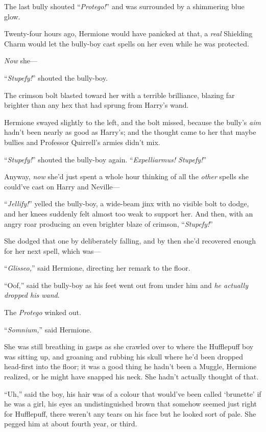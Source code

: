The last bully shouted “\emph{Protego!}” and was surrounded by a shimmering blue glow.

Twenty-four hours ago, Hermione would have panicked at that, a \emph{real} Shielding Charm would let the bully-boy cast spells on her even while he was protected.

\emph{Now} she—

“\emph{Stupefy!}” shouted the bully-boy.

The crimson bolt blasted toward her with a terrible brilliance, blazing far brighter than any hex that had sprung from Harry’s wand.

Hermione swayed slightly to the left, and the bolt missed, because the bully’s \emph{aim} hadn’t been nearly as good as Harry’s; and the thought came to her that maybe bullies and Professor Quirrell’s armies didn’t mix.

“\emph{Stupefy!}” shouted the bully-boy again. “\emph{Expelliarmus! Stupefy!}”

Anyway, \emph{now} she’d just spent a whole hour thinking of all the \emph{other} spells she could’ve cast on Harry and Neville—

“\emph{Jellify!}” yelled the bully-boy, a wide-beam jinx with no visible bolt to dodge, and her knees suddenly felt almost too weak to support her. And then, with an angry roar producing an even brighter blaze of crimson, “\emph{Stupefy!}”

She dodged that one by deliberately falling, and by then she’d recovered enough for her next spell, which was—

“\emph{Glisseo,}” said Hermione, directing her remark to the floor.

“Oof,” said the bully-boy as his feet went out from under him and \emph{he actually dropped his wand}.

The \emph{Protego} winked out.

“\emph{Somnium,}” said Hermione.

She was still breathing in gasps as she crawled over to where the Hufflepuff boy was sitting up, and groaning and rubbing his skull where he’d been dropped head-first into the floor; it was a good thing he hadn’t been a Muggle, Hermione realized, or he might have snapped his neck. She hadn’t actually thought of that.

“Uh,” said the boy, his hair was of a colour that would’ve been called ‘brunette’ if he was a girl, his eyes an undistinguished brown that somehow seemed just right for Hufflepuff, there weren’t any tears on his face but he looked sort of pale. She pegged him at about fourth year, or third.

